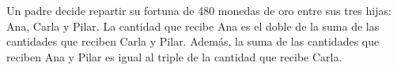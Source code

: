 \documentclass[addpoints,spanish, 12pt,a4paper]{exam}
\begin{document}
\begin{questions}


\question Un padre decide repartir su fortuna de 480 monedas de oro entre sus tres hijas: Ana,
Carla y Pilar. La cantidad que recibe Ana
es el doble de la suma de las cantidades que reciben Carla y Pilar. Además, la suma de
las cantidades que reciben Ana y Pilar es igual al triple de la cantidad que recibe Carla.
\end{questions}
\end{document}
